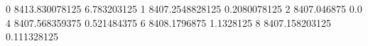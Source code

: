 0 8413.830078125 6.783203125
1 8407.2548828125 0.2080078125
2 8407.046875 0.0
4 8407.568359375 0.521484375
6 8408.1796875 1.1328125
8 8407.158203125 0.111328125
